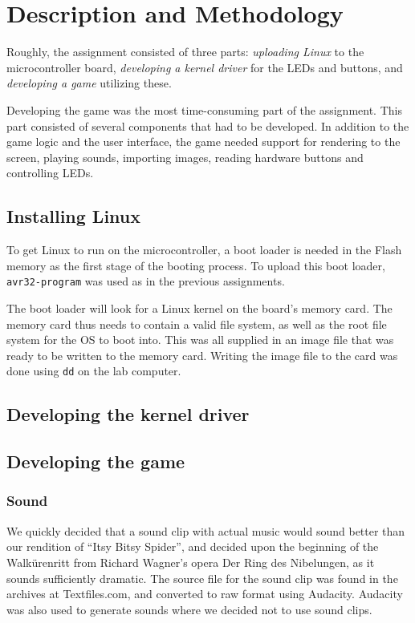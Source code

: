 \section{Description and Methodology}

Roughly, the assignment consisted of three parts: \emph{uploading Linux}
to the microcontroller board, \emph{developing a kernel driver} for the
LEDs and buttons, and \emph{developing a game} utilizing these.

Developing the game was the most time-consuming part of the assignment.
This part consisted of several components that had to be developed. In
addition to the game logic and the user interface, the game needed
support for rendering to the screen, playing sounds, importing images,
reading hardware buttons and controlling LEDs.

\subsection{Installing Linux}

To get Linux to run on the microcontroller, a boot loader is needed in
the Flash memory as the first stage of the booting process. To upload
this boot loader, \texttt{avr32-program} was used as in the previous
assignments.

The boot loader will look for a Linux kernel on the board's memory
card. The memory card thus needs to contain a valid file system, as well
as the root file system for the OS to boot into. This was all supplied
in an image file that was ready to be written to the memory card.
Writing the image file to the card was done using \texttt{dd} on the
lab computer.

\subsection{Developing the kernel driver}

\subsection{Developing the game}

\subsubsection{Sound}
We quickly decided that a sound clip with actual music would sound better than our rendition of ``Itsy Bitsy Spider'', and decided upon the beginning of the Walkürenritt from Richard Wagner's opera Der Ring des Nibelungen, as it sounds sufficiently dramatic. The source file for the sound clip was found in the archives at Textfiles.com, and converted to raw format using Audacity. Audacity was also used to generate sounds where we decided not to use sound clips.

